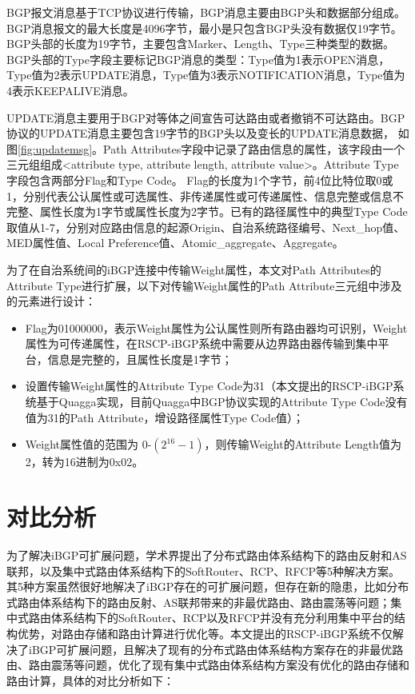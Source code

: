 BGP报文消息\cite{rfc4271}基于TCP协议进行传输，BGP消息主要由BGP头和数据部分组成。BGP消息报文的最大长度是4096字节，最小是只包含BGP头没有数据仅19字节。BGP头部的长度为19字节，主要包含Marker、Length、Type三种类型的数据。BGP头部的Type字段主要标记BGP消息的类型：Type值为1表示OPEN消息，Type值为2表示UPDATE消息，Type值为3表示NOTIFICATION消息，Type值为4表示KEEPALIVE消息。

UPDATE消息主要用于BGP对等体之间宣告可达路由或者撤销不可达路由。BGP协议的UPDATE消息主要包含19字节的BGP头以及变长的UPDATE消息数据， 如图\ref{fig:updatemsg}。Path Attributes字段中记录了路由信息的属性，该字段由一个三元组组成<attribute type, attribute length, attribute value>。Attribute Type字段包含两部分Flag和Type Code。 Flag的长度为1个字节，前4位比特位取0或1，分别代表公认属性或可选属性、非传递属性或可传递属性、信息完整或信息不完整、属性长度为1字节或属性长度为2字节。已有的路径属性中的典型Type Code取值从1-7，分别对应路由信息的起源Origin、自治系统路径编号、Next\_hop值、MED属性值、Local Preference值、Atomic\_aggregate、Aggregate。

为了在自治系统间的iBGP连接中传输Weight属性，本文对Path Attributes的Attribute Type进行扩展，以下对传输Weight属性的Path Attribute三元组中涉及的元素进行设计：
\begin{itemize}
  \item Flag为01000000，表示Weight属性为公认属性则所有路由器均可识别，Weight属性为可传递属性，在RSCP-iBGP系统中需要从边界路由器传输到集中平台，信息是完整的，且属性长度是1字节；
  \item 设置传输Weight属性的Attribute Type Code为31（本文提出的RSCP-iBGP系统基于Quagga\cite{quagga}实现，目前Quagga中BGP协议实现的Attribute Type Code没有值为31的Path Attribute，增设路径属性Type Code值）；
  \item Weight属性值的范围为 0-$(2^{16}-1)$，则传输Weight的Attribute Length值为2，转为16进制为0x02。
\end{itemize}

\section{对比分析}

为了解决iBGP可扩展问题，学术界提出了分布式路由体系结构下的路由反射和AS联邦，以及集中式路由体系结构下的SoftRouter、RCP、RFCP等5种解决方案。其5种方案虽然很好地解决了iBGP存在的可扩展问题，但存在新的隐患，比如分布式路由体系结构下的路由反射、AS联邦带来的非最优路由、路由震荡等问题；集中式路由体系结构下的SoftRouter、RCP以及RFCP并没有充分利用集中平台的结构优势，对路由存储和路由计算进行优化等。本文提出的RSCP-iBGP系统不仅解决了iBGP可扩展问题，且解决了现有的分布式路由体系结构方案存在的非最优路由、路由震荡等问题，优化了现有集中式路由体系结构方案没有优化的路由存储和路由计算，具体的对比分析如下：


